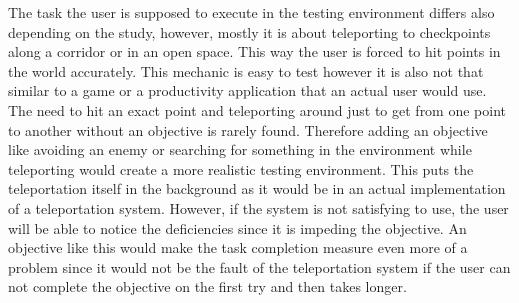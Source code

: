 The task the user is supposed to execute in the testing environment differs also depending on the study, however, mostly it is about teleporting to checkpoints along a corridor or in an open space. %
This way the user is forced to hit points in the world accurately. This mechanic is easy to test however it is also not that similar to a game or a productivity application that an actual user would use. The need to hit an exact point and teleporting around just to get from one point to another without an objective is rarely found. Therefore adding an objective like avoiding an enemy or searching for something in the environment while teleporting would create a more realistic testing environment. This puts the teleportation itself in the background as it would be in an actual implementation of a teleportation system. However, if the system is not satisfying to use, the user will be able to notice the deficiencies since it is impeding the objective. An objective like this would make the task completion measure even more of a problem since it would not be the fault of the teleportation system if the user can not complete the objective on the first try and then takes longer. 

